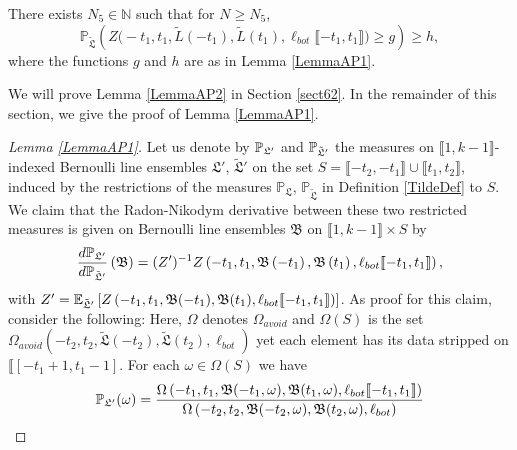 \begin{lemma}\label{LemmaAP2} There exists $N_5 \in \mathbb{N}$ such that for $N \geq N_5$,
	\begin{equation}\label{eqn57}
	\mathbb{P}_{\tilde{\mathfrak{L}}} \left( Z\big(  -t_1, t_1, \tilde{L}(-t_1) , \tilde{L}(t_1), \ell_{bot}\llbracket -t_1, t_1\rrbracket\big)\geq g    \right) \geq h,
	\end{equation}
	where the functions $g$ and $h$ are as in Lemma \ref{LemmaAP1}.
\end{lemma}
We will prove Lemma \ref{LemmaAP2} in Section \ref{sect62}. In the remainder of this section, we give the proof of Lemma \ref{LemmaAP1}.
\begin{proof}[Lemma \ref{LemmaAP1}]
	
	Let us denote by $\mathbb{P}_{\mathfrak L'}$ and $\mathbb{P}_{\tilde{\mathfrak{L}}'}$ the measures on $\llbracket 1, k-1\rrbracket$-indexed Bernoulli line ensembles $\mathfrak{L}'$, $\tilde{\mathfrak{L}}'$ on the set $S = \llbracket -t_2, -t_1 \rrbracket \cup \llbracket t_1, t_2 \rrbracket$, induced by the restrictions of the measures $\mathbb{P}_{\mathfrak{L}}$, $\mathbb{P}_{\tilde{\mathfrak{L}}}$ in Definition \ref{TildeDef} to $S$. We claim that the Radon-Nikodym derivative between these two restricted measures is given on Bernoulli line ensembles $\mathfrak B$ on $\llbracket 1, k-1\rrbracket \times S$ by \begin{equation}\label{propRadon}
	\frac{d\mathbb{P}_{\mathfrak L'}}{d\mathbb{P}_{\tilde{\mathfrak L}'}}\left(\mathfrak B\right) = (Z')^{-1} Z\left(-t_1,t_1,\mathfrak{B}\left(-t_1\right),\mathfrak{B}\left(t_1\right),\ell_{bot}\llbracket -t_1,t_1\rrbracket\right),
	\end{equation}
	with $Z' = \mathbb{E}_{\tilde{\mathfrak{L}}'}\left[Z\left(-t_1, t_1, \mathfrak B(-t_1), \mathfrak B(t_1), \ell_{bot}\llbracket -t_1, t_1\rrbracket\right)\right]$.
	As proof for this claim, consider the following: Here, $\Omega$ denotes $\Omega_{avoid}$ and  $\Omega(S)$ is the set $\Omega_{avoid}(-t_2,t_2,\tilde{\mathfrak{L}}(-t_2),\tilde{\mathfrak{L}}(t_2),\ell_{bot})$ yet each element has its data stripped on $\llbracket[-t_1+1,t_1-1]$. For each $\omega\in \Omega(S)$ we have
	\begin{equation*}
	\begin{split}
\pr_{\mathfrak{L}'}(\omega)&=\frac{\Omega\left(-t_1,t_1,\mathfrak{B}(-t_1,\omega),\mathfrak{B}(t_1,\omega),\ell_{bot}\llbracket -t_1,t_1\rrbracket\right)}{\Omega\left(-t_2,t_2,\mathfrak{B}(-t_2,\omega),\mathfrak{B}(t_2,\omega),\ell_{bot}\right)}\\

\end{split}
\end{equation*}
\end{proof}
